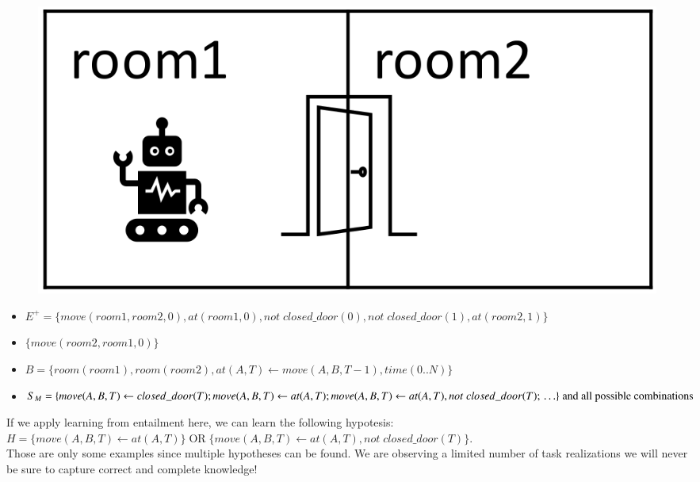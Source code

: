 \begin{minipage}[t]{0.2\textwidth}
    \begin{figure}[H]
        \includegraphics[width=\textwidth]{img/robot_room.png}
        \centering
    \end{figure}
\end{minipage}
\begin{minipage}[t]{0.8\textwidth}
    \begin{itemize}
        \item $E^+ = \{move(room1,room2,0), at(room1,0),
        not\;closed\_door(0), not\;closed\_door(1),
        at(room2,1)\}$
        \item $\{move(room2,room1,0)\}$
        \item $B = \{room(room1), room(room2), at(A,T) \leftarrow move(A,B,T-1), time(0..N)\}$
        \item $S_{M}=\{\\
                move(A,B,T) \leftarrow closed\_door(T); \\
                move(A,B,T) \leftarrow at(A,T);\\
                move(A,B,T) \leftarrow at(A,T), not\;closed\_door(T);\\
                \ldots\} \; \text{and all possible combinations}$
    \end{itemize}
\end{minipage}

\vspace{0pt}
If we apply learning from entailment here, we can learn the following hypotesis:\\
$H = \{move(A,B,T) \leftarrow at(A,T)\}\;\text{OR}\;\{move(A,B,T)\leftarrow at(A,T), not\;closed\_door(T)\}$.\\

Those are only some examples since multiple hypotheses can be found.
We are observing a limited number of task realizations we will never be sure to capture correct and complete knowledge!

